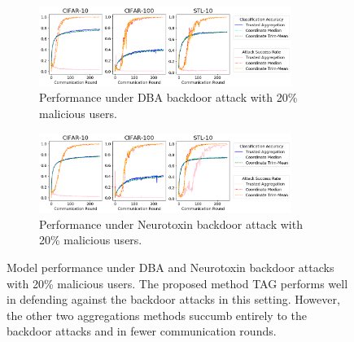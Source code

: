 \documentclass{article} %
\begin{document}
\begin{figure}
\vspace{-10pt}
  \begin{subfigure}{\textwidth}
    \includegraphics[width=0.9\textwidth]{make_article/make_visuals/visuals/accuracy--n_malicious2--dba1--beta0.2.png}
    \caption{\footnotesize Performance under DBA backdoor attack with 20\% malicious users.}
  \end{subfigure}%

  \begin{subfigure}{\textwidth}
    \includegraphics[width=0.9\textwidth]{make_article/make_visuals/visuals/accuracy--n_malicious2--dba1--beta0.2--neuro_p0.1.png}
    \caption{\footnotesize Performance under Neurotoxin backdoor attack with 20\% malicious users.}
  \end{subfigure}%
 \vspace{-5pt}
\caption{\footnotesize Model performance under DBA and Neurotoxin backdoor attacks with 20\% malicious users. The proposed method TAG performs well in defending against the backdoor attacks in this setting. However, the other two aggregations methods succumb entirely to the backdoor attacks and in fewer communication rounds.} 
\label{fig: accuracy--dba1--n_malicious2}
\vspace{-10pt}
\end{figure}
\end{document}
